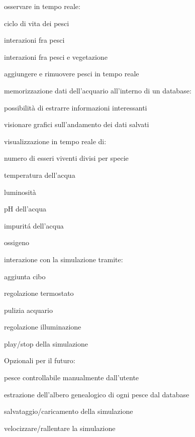 \documentclass[12pt,a4paper,oneside,article]{article}
\begin{document}
	\begin{legal}[label*=2.\arabic*.]
    	\item osservare in tempo reale:
    	\begin{legal}
    		\item ciclo di vita dei pesci
    		\item interazioni fra pesci
    		\item interazioni fra pesci e vegetazione
    	\end{legal}
    	\item aggiungere e rimuovere pesci in tempo reale
    	\item memorizzazione dati dell'acquario all’interno di un database:
    	\begin{legal}
    		\item possibilità di estrarre informazioni interessanti
    		\item visionare grafici sull'andamento dei dati salvati
    	\end{legal}
    	\item visualizzazione in tempo reale di:
    	\begin{legal}
    		\item numero di esseri viventi divisi per specie
    		\item temperatura dell’acqua
    		\item luminosità
    		\item pH dell’acqua
    		\item impurit\'a dell’acqua
    		\item ossigeno
    	\end{legal}
    	\item interazione con la simulazione tramite:
    	\begin{legal}
    		\item aggiunta cibo
    		\item regolazione termostato
    		\item pulizia acquario
    		\item regolazione illuminazione
    		\item play/stop della simulazione
    	\end{legal}
    	\item Opzionali per il futuro:
    	\begin{legal}
    		\item pesce controllabile manualmente dall’utente
    		\item estrazione dell’albero genealogico di ogni pesce dal database
    		\item salvataggio/caricamento della simulazione
    		\item velocizzare/rallentare la simulazione
    	\end{legal}
    \end{legal}
    
\end{document}
